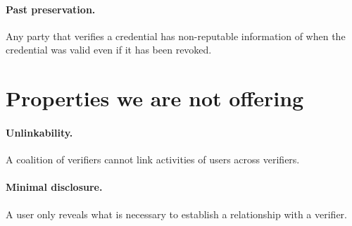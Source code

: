 \documentclass[10pt,a4paper]{article}
\begin{document}
\paragraph{Past preservation.} Any party that verifies a credential has non-reputable information of when the credential was valid even if it has been revoked.

\section{Properties we are not offering}

\paragraph{Unlinkability.} A coalition of verifiers cannot link activities of users across verifiers.
\paragraph{Minimal disclosure.} A user only reveals what is necessary to establish a relationship with a verifier.


\end{document}
